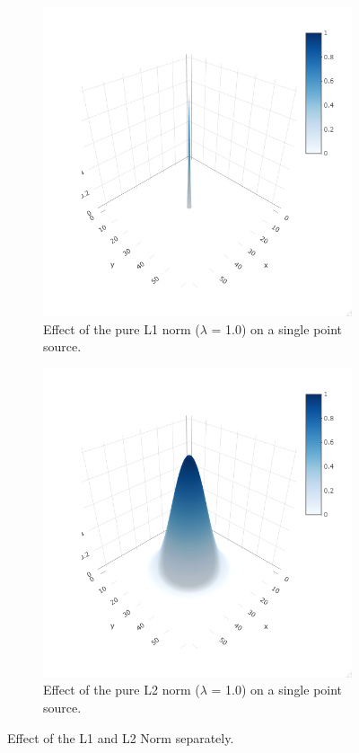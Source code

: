 \begin{figure}[h]
	\centering
	\begin{subfigure}[b]{0.4\linewidth}
		\includegraphics[width=\linewidth]{./chapters/03.CD/L1.png}
		\caption{Effect of the pure L1 norm ($\lambda$ = 1.0) on a single point source.}
		\label{cd:elastic:L1}
	\end{subfigure}
	\begin{subfigure}[b]{0.4\linewidth}
		\includegraphics[width=\linewidth]{./chapters/03.CD/L2.png}
		\caption{Effect of the pure L2 norm ($\lambda$ = 1.0) on a single point source.}
		\label{cd:elastic:L2}
	\end{subfigure}
	
	\caption{Effect of the L1 and L2 Norm separately.}
	\label{cd:elastic}
\end{figure}

